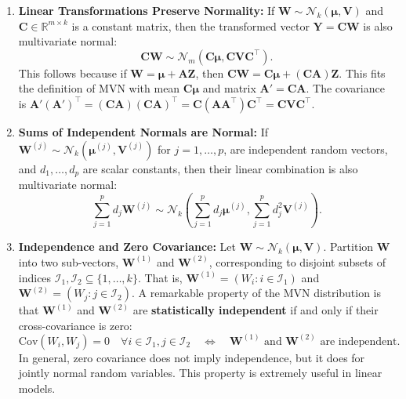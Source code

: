 \documentclass[11pt, letterpaper]{article}
\theoremstyle{plain} %
\theoremstyle{definition} %
\theoremstyle{remark} %
\newcommand{\R}{\mathbb{R}}
\newcommand{\Cov}{\mathrm{Cov}} %
\newcommand{\Normal}{\mathcal{N}}
\begin{document}
\begin{enumerate}
    \item \textbf{Linear Transformations Preserve Normality:} If $\boldsymbol{W} \sim \Normal_k(\boldsymbol{\mu}, \boldsymbol{V})$ and $\boldsymbol{C} \in \R^{m \times k}$ is a constant matrix, then the transformed vector $\boldsymbol{Y} = \boldsymbol{C}\boldsymbol{W}$ is also multivariate normal:
    \[
    \boldsymbol{C}\boldsymbol{W} \sim \Normal_m(\boldsymbol{C}\boldsymbol{\mu}, \boldsymbol{C}\boldsymbol{V}\boldsymbol{C}^{\top}).
    \]
    This follows because if $\boldsymbol{W} = \boldsymbol{\mu} + \boldsymbol{A}\boldsymbol{Z}$, then $\boldsymbol{C}\boldsymbol{W} = \boldsymbol{C}\boldsymbol{\mu} + (\boldsymbol{C}\boldsymbol{A})\boldsymbol{Z}$. This fits the definition of MVN with mean $\boldsymbol{C}\boldsymbol{\mu}$ and matrix $\boldsymbol{A}' = \boldsymbol{C}\boldsymbol{A}$. The covariance is $\boldsymbol{A}'(\boldsymbol{A}')^{\top} = (\boldsymbol{C}\boldsymbol{A})(\boldsymbol{C}\boldsymbol{A})^{\top} = \boldsymbol{C}(\boldsymbol{A}\boldsymbol{A}^{\top})\boldsymbol{C}^{\top} = \boldsymbol{C}\boldsymbol{V}\boldsymbol{C}^{\top}$.

    \item \textbf{Sums of Independent Normals are Normal:} If $\boldsymbol{W}^{(j)} \sim \Normal_k(\boldsymbol{\mu}^{(j)}, \boldsymbol{V}^{(j)})$ for $j=1, \ldots, p$, are independent random vectors, and $d_1, \ldots, d_p$ are scalar constants, then their linear combination is also multivariate normal:
    \[
    \sum_{j=1}^{p} d_j \boldsymbol{W}^{(j)} \sim \Normal_k \left( \sum_{j=1}^{p} d_j \boldsymbol{\mu}^{(j)}, \sum_{j=1}^{p} d_j^2 \boldsymbol{V}^{(j)} \right).
    \]

    \item \textbf{Independence and Zero Covariance:} Let $\boldsymbol{W} \sim \Normal_k(\boldsymbol{\mu}, \boldsymbol{V})$. Partition $\boldsymbol{W}$ into two sub-vectors, $\boldsymbol{W}^{(1)}$ and $\boldsymbol{W}^{(2)}$, corresponding to disjoint subsets of indices $\mathcal{I}_1, \mathcal{I}_2 \subseteq \{1, \ldots, k\}$. That is, $\boldsymbol{W}^{(1)} = (W_i : i \in \mathcal{I}_1)$ and $\boldsymbol{W}^{(2)} = (W_j : j \in \mathcal{I}_2)$. A remarkable property of the MVN distribution is that $\boldsymbol{W}^{(1)}$ and $\boldsymbol{W}^{(2)}$ are \textbf{statistically independent} if and only if their cross-covariance is zero:
    \[
    \Cov(W_i, W_j) = 0 \quad \forall i \in \mathcal{I}_1, j \in \mathcal{I}_2 \quad \Longleftrightarrow \quad \boldsymbol{W}^{(1)} \text{ and } \boldsymbol{W}^{(2)} \text{ are independent.}
    \]
    In general, zero covariance does not imply independence, but it does for jointly normal random variables. This property is extremely useful in linear models.
\end{enumerate}
\end{document}
